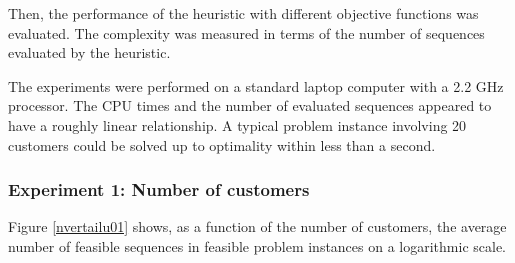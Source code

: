 \documentclass[dissertation,draft*]{aaltoseries}
\begin{document}
Then, the performance of the heuristic with different objective functions was evaluated.
The complexity was measured in terms of the number of sequences evaluated by the heuristic.

The experiments were performed on a standard laptop computer with a 2.2 GHz processor. 
The CPU times and the number of evaluated sequences appeared to have a roughly linear relationship.
A typical problem instance involving 20 customers could be solved up to optimality within less than a second.


\subsubsection{Experiment 1: Number of customers}
Figure \ref{nvertailu01} shows, as a function of the number of customers, the average number of feasible sequences in feasible problem instances 
on a logarithmic scale.

\end{document}
